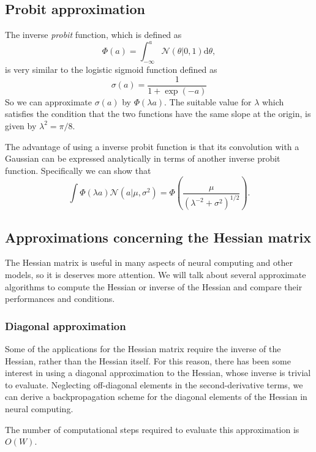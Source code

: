 \documentclass[a4paper]{report}
\newcommand{\ud}{\mathrm{d}}
\renewcommand{\cal}{\mathcal}
\newcommand{\imp}[1]{{\color{blue}\textit{#1}}}
\begin{document}
\subsection{Probit approximation}
The inverse \imp{probit} function, which is defined as
\begin{equation}
	\Phi(a) = \int_{-\infty}^{a} \cal{N}(\theta|0,1) \ud \theta,
\end{equation}
is very similar to the logistic sigmoid function defined as
\begin{equation}
	\sigma(a) =  \frac{1}{1+\exp(-a)}
\end{equation}
So we can approximate $\sigma(a)$ by $\Phi(\lambda a)$. The suitable value for $\lambda$ which satisfies the condition that the two functions have the same slope at the origin, is given by $\lambda ^2 = \pi/8$.

The advantage of using a inverse probit function is that its convolution with a Gaussian can be expressed analytically in terms of another inverse probit function. Specifically we can show that
\begin{equation}
	\int \Phi(\lambda a)\cal{N} (a|\mu,\sigma^2) = \Phi\left(\frac{\mu}{(\lambda^{-2}+\sigma^2)^{1/2}} \right).
\end{equation}
\subsection{Approximations concerning the Hessian matrix}
The Hessian matrix is useful in many aspects of neural computing and other models, so it is deserves more attention. We will talk about several approximate algorithms to compute the Hessian or inverse of the Hessian and compare their performances and conditions.
\subsubsection{Diagonal approximation}
Some of the applications for the Hessian matrix require the inverse of the Hessian, rather than the Hessian itself. For this reason, there has been some interest in using a diagonal approximation to the Hessian, whose inverse is trivial to evaluate. Neglecting off-diagonal elements in the second-derivative terms, we can derive a backpropagation scheme for the diagonal elements of the Hessian in neural computing.

The number of computational steps required to evaluate this approximation is $O(W)$.
\end{document}
